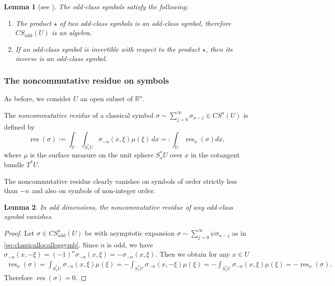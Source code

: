 \documentclass[11pt]{article}
\newtheorem{lemma}{Lemma}
\DeclareMathOperator{\res}{res} \DeclareMathOperator{\Res}{Res}
\DeclareMathOperator{\odd}{odd} \DeclareMathOperator{\supp}{supp}
\newcommand{\R}{{\mathbb R}}
\begin{document}
\begin{lemma}[see \cite{ducourtiouxthese, kontsevichdeterminant}]\label{lemmaoddclasssymbols}
The odd-class symbols satisfy the following:
\begin{enumerate}\itemsep=0pt
\item The product $\star$ of two odd-class symbols is an odd-class symbol, therefore $CS_{\odd}(U)$ is an algebra.
\item If an odd-class symbol is invertible with respect to the product $\star$, then its inverse is an odd-class symbol.
\end{enumerate}
\end{lemma}

\subsubsection{The noncommutative residue on symbols}

As before, we consider $U$ an open subset of $\R^n$.

\begin{definition}
The \emph{noncommutative residue} of a classical symbol $\sigma\sim\sum\limits_{j=0}^\infty\sigma_{a-j}\in CS^a(U)$ is def\/ined by
\[
\res(\sigma):=\int_U \int_{S_x^{*}U} \sigma_{-n}(x,\xi) \mu(\xi)\, dx=:\int_U \res_x(\sigma)dx,
\]
where $\mu$ is the surface measure on the unit sphere $S_x^{*}U$ over $x$ in the cotangent bundle $T^*U$.
\end{definition}
The noncommutative residue clearly vanishes on symbols of order strictly less than $-n$ and also on symbols of non-integer order.

\begin{lemma}\label{eq: nullityRES}
In odd dimensions, the noncommutative residue of any odd-class symbol vanishes.
\end{lemma}

\begin{proof}
Let $\sigma\in CS_{\odd}^a(U)$ be with asymptotic expansion $\sigma\sim\sum\limits_{j=0}^\infty\psi \sigma_{a-j}$ as in \eqref{eq:classicallocallogsymb}. Since $n$ is odd, we have $\sigma_{-n}(x,-\xi)=(-1)^{n}\sigma_{-n}(x,\xi)=-\sigma_{-n}(x,\xi)$. Then we obtain for any $x\in U$
\begin{gather*}
\res_x(\sigma)=\int_{S_x^{*}U}\!\!\sigma_{-n}(x,\xi)\mu(\xi)=-\int_{S_x^{*}U}\!\!\sigma_{-n}(x,-\xi)\mu(\xi)
=-\int_{S_x^{*}U}\!\!\sigma_{-n}(x,\xi)\mu(\xi)=-\res_x(\sigma).
\end{gather*}
Therefore $\res(\sigma)=0$.
\end{proof}
\end{document}
